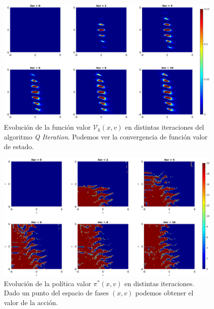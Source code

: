 \begin{example}
    \begin{figure} 
        \centering
        \includegraphics[scale=0.45]{img/valueiteration.eps}
        \caption[Evolución de la función vlaor por \emph{Value Iteration}]{Evolución de la función valor $\mathcal{V}_k(x,v)$ en distintas iteraciones del algoritmo  \emph{Q Iteration}. Podemos ver la convergencia de función valor de estado.}
        \label{fig:valueiteration}
    \end{figure} 

    \begin{figure} 
        \centering
        \includegraphics[scale=0.5]{img/valueiterationpi.eps}
        \caption[Evolución de la política por \emph{Value Iteration}]{
         Evolución de la política valor $\pi^*(x,v)$ en distintas iteraciones. Dado un punto del espacio de fases $(x,v)$ podemos obtener el valor de la acción. }
        \label{fig:piiteration}
    \end{figure} 


\end{example}
